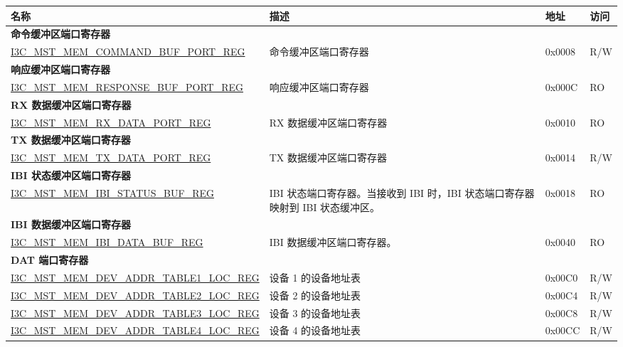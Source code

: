 \begin{longtable}{ | p{8cm} | p{5.5cm} | p{1.3cm} | p{1cm} | }
\hline\rowcolor{lightgray}
\textbf{名称} & \textbf{描述} &  \textbf{地址} & \textbf{访问} \\ \hline
\endhead
\multicolumn{4}{|l|}{\textbf{命令缓冲区端口寄存器}} \\ \hline
\hyperref[regdesc:I3CMSTMEMCOMMANDBUFPORTREG]{I3C\_MST\_MEM\_COMMAND\_BUF\_PORT\_REG} & 命令缓冲区端口寄存器 & 0x0008 & R/W \\ \hline
\multicolumn{4}{|l|}{\textbf{响应缓冲区端口寄存器}} \\ \hline
\hyperref[regdesc:I3CMSTMEMRESPONSEBUFPORTREG]{I3C\_MST\_MEM\_RESPONSE\_BUF\_PORT\_REG} & 响应缓冲区端口寄存器 & 0x000C & RO \\ \hline
\multicolumn{4}{|l|}{\textbf{RX 数据缓冲区端口寄存器}} \\ \hline
\hyperref[regdesc:I3CMSTMEMRXDATAPORTREG]{I3C\_MST\_MEM\_RX\_DATA\_PORT\_REG} & RX 数据缓冲区端口寄存器 & 0x0010 & RO \\ \hline
\multicolumn{4}{|l|}{\textbf{TX 数据缓冲区端口寄存器}} \\ \hline
\hyperref[regdesc:I3CMSTMEMTXDATAPORTREG]{I3C\_MST\_MEM\_TX\_DATA\_PORT\_REG} & TX 数据缓冲区端口寄存器 & 0x0014 & R/W \\ \hline
\multicolumn{4}{|l|}{\textbf{IBI 状态缓冲区端口寄存器}} \\ \hline
\hyperref[regdesc:I3CMSTMEMIBISTATUSBUFREG]{I3C\_MST\_MEM\_IBI\_STATUS\_BUF\_REG} & IBI 状态端口寄存器。当接收到 IBI 时，IBI 状态端口寄存器映射到 IBI 状态缓冲区。 & 0x0018 & RO \\ \hline
\multicolumn{4}{|l|}{\textbf{IBI 数据缓冲区端口寄存器}} \\ \hline
\hyperref[regdesc:I3CMSTMEMIBIDATABUFREG]{I3C\_MST\_MEM\_IBI\_DATA\_BUF\_REG} & IBI 数据缓冲区端口寄存器。 & 0x0040 & RO \\ \hline
\multicolumn{4}{|l|}{\textbf{DAT 端口寄存器}} \\ \hline
\hyperref[regdesc:I3CMSTMEMDEVADDRTABLENLOCREG]{I3C\_MST\_MEM\_DEV\_ADDR\_TABLE1\_LOC\_REG} & 设备 1 的设备地址表 & 0x00C0 & R/W \\ \hline
\hyperref[regdesc:I3CMSTMEMDEVADDRTABLENLOCREG]{I3C\_MST\_MEM\_DEV\_ADDR\_TABLE2\_LOC\_REG} & 设备 2 的设备地址表 & 0x00C4 & R/W \\ \hline
\hyperref[regdesc:I3CMSTMEMDEVADDRTABLENLOCREG]{I3C\_MST\_MEM\_DEV\_ADDR\_TABLE3\_LOC\_REG} & 设备 3 的设备地址表 & 0x00C8 & R/W \\ \hline
\hyperref[regdesc:I3CMSTMEMDEVADDRTABLENLOCREG]{I3C\_MST\_MEM\_DEV\_ADDR\_TABLE4\_LOC\_REG} & 设备 4 的设备地址表 & 0x00CC & R/W \\ \hline

\end{longtable}
